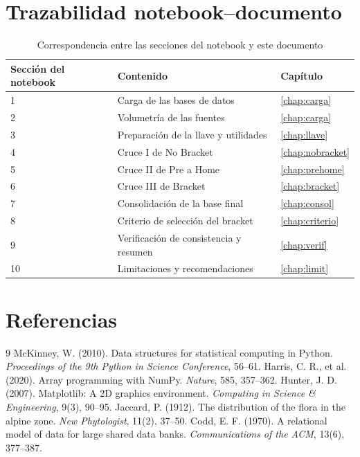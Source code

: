 \documentclass[11pt,a4paper,oneside]{book}
\newcommand{\hd}[1]{\sffamily\bfseries\color{white}#1}
\newcommand{\tablehead}{\rowcolor{navy}}
\begin{document}
\chapter{Trazabilidad notebook--documento}\label{anx:traza}
\begin{table}[H]
\centering
\caption{Correspondencia entre las secciones del notebook y este documento}\label{tab:traza}
\small
\begin{tabularx}{\textwidth}{@{}lXl@{}}
\toprule
\tablehead \hd{Sección del notebook} & \hd{Contenido} & \hd{Capítulo}\\
\midrule
1 & Carga de las bases de datos & \ref{chap:carga} \\
2 & Volumetría de las fuentes & \ref{chap:carga} \\
3 & Preparación de la llave y utilidades & \ref{chap:llave} \\
4 & Cruce I de No Bracket & \ref{chap:nobracket} \\
5 & Cruce II de Pre a Home & \ref{chap:prehome} \\
6 & Cruce III de Bracket & \ref{chap:bracket} \\
7 & Consolidación de la base final & \ref{chap:consol} \\
8 & Criterio de selección del bracket & \ref{chap:criterio} \\
9 & Verificación de consistencia y resumen & \ref{chap:verif} \\
10 & Limitaciones y recomendaciones & \ref{chap:limit} \\
\bottomrule
\end{tabularx}
\end{table}

\backmatter
\chapter*{Referencias}
\begin{thebibliography}{9}
 McKinney, W. (2010). Data structures for statistical computing in Python. \emph{Proceedings of the 9th Python in Science Conference}, 56--61.
 Harris, C. R., et al. (2020). Array programming with NumPy. \emph{Nature}, 585, 357--362.
 Hunter, J. D. (2007). Matplotlib: A 2D graphics environment. \emph{Computing in Science \& Engineering}, 9(3), 90--95.
 Jaccard, P. (1912). The distribution of the flora in the alpine zone. \emph{New Phytologist}, 11(2), 37--50.
 Codd, E. F. (1970). A relational model of data for large shared data banks. \emph{Communications of the ACM}, 13(6), 377--387.
\end{thebibliography}

\clearpage
\printindex
\end{document}
